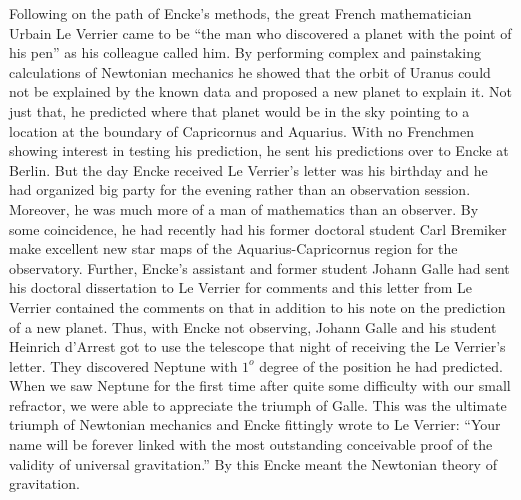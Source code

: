 \documentclass[11pt]{article} %
\numberwithin{equation}{section}
\begin{document}
Following on the path of Encke’s methods, the great French mathematician Urbain Le Verrier came to be “the man who discovered a planet with the point of his pen” as his colleague called him. By performing complex and painstaking calculations of Newtonian mechanics he showed that the orbit of Uranus could not be explained by the known data and proposed a new planet to explain it. Not just that, he predicted where that planet would be in the sky pointing to a location at the boundary of Capricornus and Aquarius. With no Frenchmen showing interest in testing his prediction, he sent his predictions over to Encke at Berlin. But the day Encke received Le Verrier’s letter was his birthday and he had organized big party for the evening rather than an observation session. Moreover, he was much more of a man of mathematics than an observer. By some coincidence, he had recently had his former doctoral student Carl Bremiker make excellent new star maps of the Aquarius-Capricornus region for the observatory. Further, Encke’s assistant and former student Johann Galle had sent his doctoral dissertation to Le Verrier for comments and this letter from Le Verrier contained the comments on that in addition to his note on the prediction of a new planet. Thus, with Encke not observing, Johann Galle and his student Heinrich d'Arrest got to use the telescope that night of receiving the Le Verrier’s letter. They discovered Neptune with $1^o$ degree of the position he had predicted. When we saw Neptune for the first time after quite some difficulty with our small refractor, we were able to appreciate the triumph of Galle. This was the ultimate triumph of Newtonian mechanics and Encke fittingly wrote to Le Verrier: “Your name will be forever linked with the most outstanding conceivable proof of the validity of universal gravitation.” By this Encke meant the Newtonian theory of gravitation.\\
\end{document}
